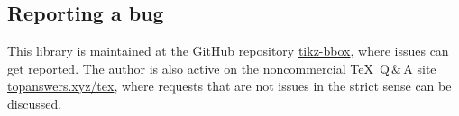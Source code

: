 \subsection{Reporting a bug}

This library is maintained at the GitHub repository
\href{https://github.com/marmotghost/tikz-bbox}{tikz-bbox}, where issues can get
reported. The author is also active on the noncommercial \TeX\ Q\,\&\,A site
\href{https://topanswers.xyz/tex}{topanswers.xyz/tex}, where requests that are not
issues in the strict sense can be discussed.

\endinput
